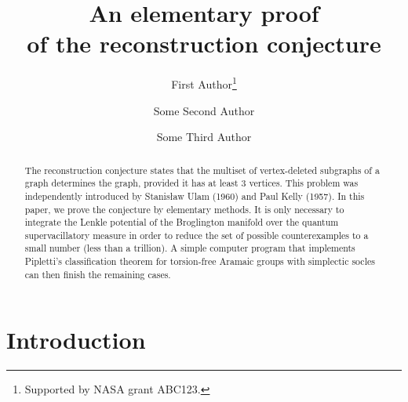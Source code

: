\documentclass[12pt]{article}
\title{An elementary proof\\ of the reconstruction conjecture}
\author[1]{First Author\thanks{Supported by NASA grant ABC123.}}
\author[2]{Some Second Author}
\author[3]{Some Third Author}
\affil[1]{%
Department of Inconsequential Studies, Solatido College, North Kentucky, U.S.A.

\email{fa@solatido.edu}%
}
\affil[2,3]{%
School of Hard Knocks, University of Western Nowhere, Somewhere, Australia

\email{ssa@uwn.edu.au}, \email{sta@uwn.edu.au}%
}
\begin{document}

\maketitle


\begin{abstract}
  The reconstruction conjecture states that the multiset of 
  vertex-deleted subgraphs of a graph determines the graph, provided
  it has at least 3 vertices.  This problem was independently introduced
  by Stanis\l aw Ulam (1960) and Paul Kelly (1957). In this paper,
  we prove the conjecture by elementary methods. 
  It is only necessary
  to integrate the Lenkle potential of the Broglington manifold over
  the quantum supervacillatory measure in order to reduce the set of
  possible counterexamples to a small number (less than a trillion).
  A simple computer program that implements Pipletti's classification
  theorem for torsion-free Aramaic groups with simplectic socles can
  then finish the remaining cases.
\end{abstract}



\section{Introduction}
\end{document}
